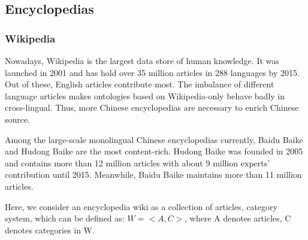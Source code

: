 \documentclass[runningheads,a4paper]{llncs}
\begin{document}
\subsection{Encyclopedias}
\label{sec:encyclopedias}
\subsubsection{Wikipedia}
Nowadays, Wikipedia is the largest data store of human knowledge. It was launched in 2001 and has hold over 35 million articles in 288 languages by 2015. Out of these, English articles contribute most. The imbalance of different language articles makes ontologies based on Wikipedia-only behave badly in cross-lingual. Thus, more Chinese encyclopedias are necessary to enrich Chinese source.

Among the large-scale monolingual Chinese encyclopedias currently, Baidu Baike and Hudong Baike are the most content-rich. Hudong Baike was founded in 2005 and contains more than 12 million articles with about 9 million experts' contribution until 2015. Meanwhile, Baidu Baike maintains more than 11 million articles.

Here, we consider an encyclopedia wiki as a collection of articles, category system, which can be defined as: $W = <A,C>$, where A denotes articles, C denotes categories in W.
\end{document}
